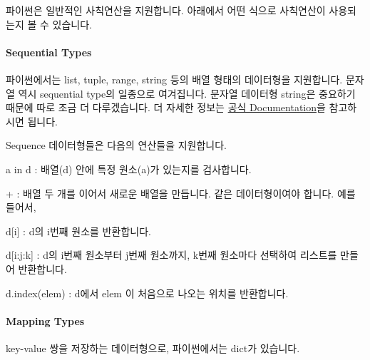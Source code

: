 \documentclass[twoside]{article}
\begin{document}


파이썬은 일반적인 사칙연산을 지원합니다. 아래에서 어떤 식으로 사칙연산이 사용되는지 볼 수 있습니다. 




\paragraph{Sequential Types} 파이썬에서는 list, tuple, range, string 등의 배열 형태의 데이터형을 지원합니다. 문자열 역시 sequential type의 일종으로 여겨집니다. 문자열 데이터형 string은 중요하기 때문에 따로 조금 더 다루겠습니다. 더 자세한 정보는 \href{https://docs.python.org/3/library/stdtypes.html#sequence-types-list-tuple-range}{공식 Documentation}을 참고하시면 됩니다. 




Sequence 데이터형들은 다음의 연산들을 지원합니다. 
\begin{compactitem} 
\item a in d : 배열(d) 안에 특정 원소(a)가 있는지를 검사합니다. 
\item + : 배열 두 개를 이어서 새로운 배열을 만듭니다. 같은 데이터형이여야 합니다. 예를 들어서, 
\item d[i] : d의 i번째 원소를 반환합니다. 
\item d[i:j:k] : d의 i번째 원소부터 j번째 원소까지, k번째 원소마다 선택하여 리스트를 만들어 반환합니다. 
\item d.index(elem) : d에서 elem 이 처음으로 나오는 위치를 반환합니다. 
\end{compactitem}



\paragraph{Mapping Types} key-value 쌍을 저장하는 데이터형으로, 파이썬에서는 dict가 있습니다. 


\end{document}
